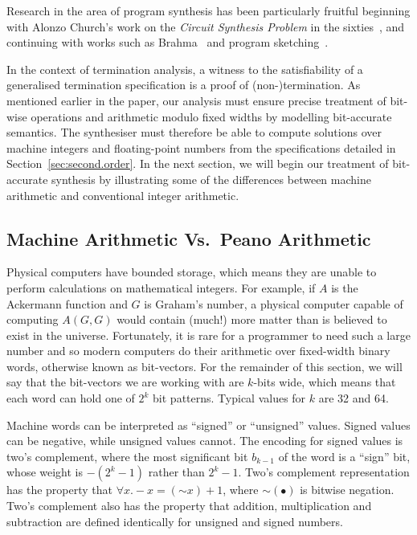 \documentclass[a4paper]{llncs}
\begin{document}
Research in the area of program synthesis has been
particularly fruitful beginning with Alonzo Church's work on the
\emph{Circuit Synthesis Problem} in the sixties~\cite{church-synth}, and
continuing with works such as {\sc Brahma}~\cite{brahma} and program
sketching~\cite{lezama-thesis,sketch,modular-sketch}.

In the context of termination analysis, a witness to the
satisfiability of a generalised termination specification is a
proof of \mbox{(non-)termination}.  As mentioned earlier in the paper, our
analysis must ensure precise treatment of bit-wise operations and arithmetic
modulo fixed widths by modelling bit-accurate semantics.  The synthesiser
must therefore be able to compute solutions over machine
integers and floating-point numbers from the specifications detailed in
Section~\ref{sec:second.order}.  In the next section, we will begin our treatment of
bit-accurate synthesis by illustrating some of the differences between
machine arithmetic and conventional integer arithmetic.


\subsection{Machine Arithmetic Vs.~Peano Arithmetic} \label{sec:machine.arith} 

Physical computers have bounded storage, which means they are unable to
perform calculations on mathematical integers.  For example, if $A$ is the
Ackermann function and $G$ is Graham's number, a physical computer capable
of computing $A(G, G)$ would contain (much!) more matter than is believed to
exist in the universe.  Fortunately, it is rare for a programmer to need
such a large number and so modern computers do their arithmetic over
fixed-width binary words, otherwise known as bit-vectors.  For the remainder
of this section, we will say that the bit-vectors we are working with are
$k$-bits wide, which means that each word can hold one of $2^k$ bit
patterns.  Typical values for $k$ are 32 and 64.

Machine words can be interpreted as ``signed'' or ``unsigned'' values. 
Signed values can be negative, while unsigned values cannot.  The encoding
for signed values is two's complement, where the most significant bit
$b_{k-1}$ of the word is a ``sign'' bit, whose weight is $-(2^k - 1)$ rather
than $2^k - 1$.  Two's complement representation has the property that
$\forall x .  -x = (\mathord{\sim} x) + 1$, where $\mathord{\sim}(\bullet)$
is bitwise negation.  Two's complement also has the property that addition,
multiplication and subtraction are defined identically for unsigned and
signed numbers.
\end{document}
